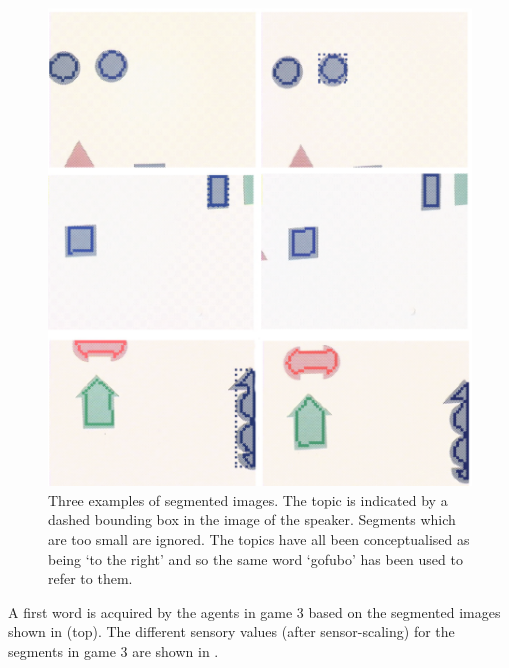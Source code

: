 \begin{figure}
\begin{center}
\includegraphics[width=0.8\columnwidth]{chap7/figs/plate-10.pdf}
\end{center}
\caption{Three examples of segmented images. The 
topic is indicated by a dashed bounding box in the 
image of the speaker. Segments which are too small 
are ignored. The topics have all been conceptualised
as being `to the right' and so the same word 
`gofubo' has been used to refer to them. }
\label{fig:plate-10}
\end{figure}

A first word is acquired by the agents in game 3 
based on the segmented images shown in  (top).
The different sensory values (after sensor-scaling)
for the segments in game 3 are shown in . 


